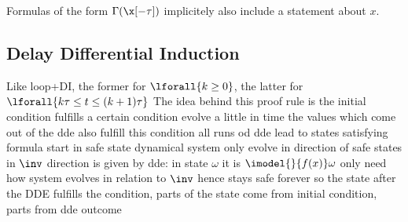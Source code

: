         Formulas of the form $\Gamma(\x[-\tau])$ implicitely also include a statement about $x$.

    \subsection{Delay Differential Induction}
        \label{sec:delay-differential-induction}

        Like loop+DI, the former for $\lforall{k\geq 0}$, the latter for $\lforall{k\tau\leq t \leq (k+1)\tau}$
        The idea behind this proof rule is
        the initial condition fulfills a certain condition
        evolve a little in time
        the values which come out of the dde also fulfill this condition
        all runs od dde lead to states satisfying formula
        start in safe state
        dynamical system only evolve in direction of safe states in $\inv$
        direction is given by dde: in state $\omega$ it is $\imodel{}{f(x)}\omega$
        only need how system evolves in relation to $\inv$
        hence stays safe forever
        so the state after the DDE fulfills the condition, parts of the state come from initial condition, parts from dde outcome

        \begin{calculus}
        \end{calculus}

